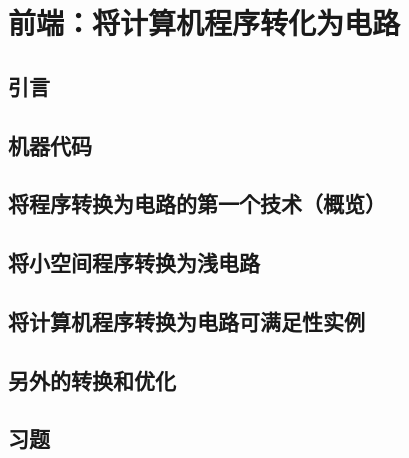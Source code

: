 \chapter{前端：将计算机程序转化为电路}\label{chp:06FrontEnds}

\section{引言}\label{6.1}
\section{机器代码}\label{6.2}
\section{将程序转换为电路的第一个技术（概览）}\label{6.3}
\section{将小空间程序转换为浅电路}\label{6.4}
\section{将计算机程序转换为电路可满足性实例}\label{6.5}
\section{另外的转换和优化}\label{6.6}
\section{习题}\label{6.7}